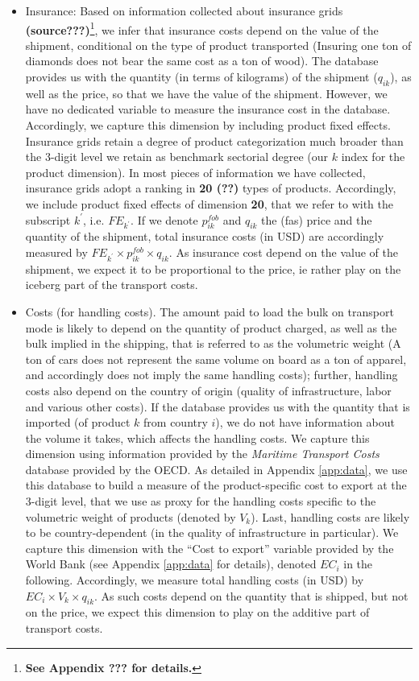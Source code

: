 \documentclass[a4paper,11pt]{article}
\begin{document}
\begin{itemize}
\item Insurance: Based on information collected about insurance grids \textbf{(source???)}\footnote{\textbf{See Appendix ??? for details.}}, we infer that insurance costs depend on the value of the shipment, conditional on the type of product transported (Insuring one ton of diamonds does not bear the same cost as a ton of wood). The database provides us with the quantity (in terms of kilograms) of the shipment ($q_{ik}$), as well as the price, so that we have the value of the shipment. However, we have no dedicated variable to measure the insurance cost in the database. Accordingly, we capture this dimension by including product fixed effects. Insurance grids retain a degree of product categorization much broader than the 3-digit level we retain as benchmark sectorial degree (our $k$ index for the product dimension). In most pieces of information we have collected, insurance grids adopt a ranking in \textbf{20 (??)} types of products. Accordingly, we include product fixed effects of dimension \textbf{20}, that we refer to with the subscript $k^\prime$, i.e. $FE_{k^\prime}$. If we denote $p_{ik}^{fob}$ and $q_{ik}$ the (fas) price and the quantity of the shipment, total insurance costs (in USD) are accordingly measured by $FE_{k^\prime}\times p_{ik}^{fob}\times q_{ik}$. As insurance cost depend on the value of the shipment, we expect it to be proportional to the price, ie rather play on the iceberg part of the transport costs.

\item Costs (for handling costs). The amount paid to load the bulk on transport mode is likely to depend on the quantity of product charged, as well as the bulk implied in the shipping, that is referred to as the volumetric weight (A ton of cars does not represent the same volume on board as a ton of apparel, and accordingly does not imply the same handling costs); further, handling costs also depend on the country of origin (quality of infrastructure, labor and various other costs). If the database provides us with the quantity that is imported (of product $k$ from country $i$), we do not have information about the volume it takes, which affects the handling costs. We capture this dimension using information provided by the \textit{Maritime Transport Costs} database provided by the OECD. As detailed in Appendix \ref{app:data}, we use this database to build a measure of the product-specific cost to export at the 3-digit level, that we use as proxy for the handling costs specific to the volumetric weight of products (denoted by $V_{k}$). Last, handling costs are likely to be country-dependent (in the quality of infrastructure in particular). We capture this dimension with the ``Cost to export'' variable provided by the World Bank (see Appendix \ref{app:data} for details), denoted $EC_{i}$ in the following. Accordingly, we measure total handling costs (in USD) by $EC_i\times V_{k}\times q_{ik}$. As such costs depend on the quantity that is shipped, but not on the price, we expect this dimension to play on the additive part of transport costs.


\end{itemize}
\end{document}

